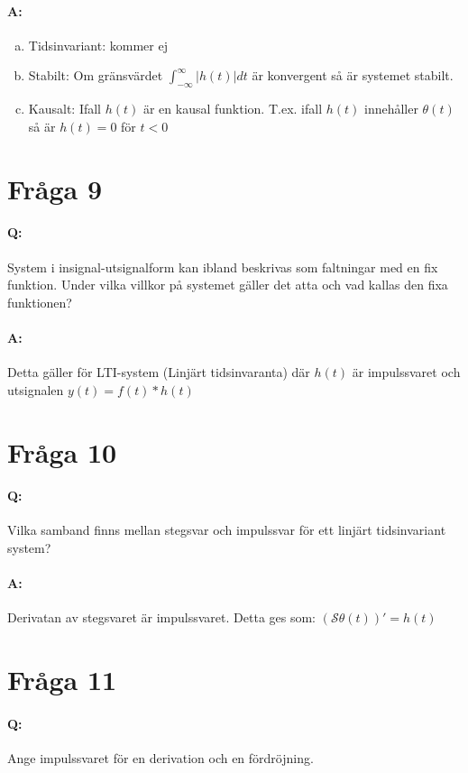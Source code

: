 \documentclass[a4paper]{article}
\begin{document}
\paragraph{A:}
\begin{enumerate}[b)]
\item Tidsinvariant: kommer ej
\item Stabilt: Om gränsvärdet $\int_{-\infty}^{\infty} |h(t)|dt$ är konvergent så är systemet stabilt.
\item Kausalt: Ifall $h(t)$ är en kausal funktion. T.ex. ifall $h(t)$ innehåller $\theta(t)$ så är $h(t)=0$ för $t<0$
\end{enumerate}
\newpage
\section{Fråga 9}
\paragraph{Q:} System i insignal-utsignalform kan ibland beskrivas som faltningar med en fix funktion. Under vilka villkor på systemet gäller det atta och vad kallas den fixa funktionen?
\paragraph{A:} Detta gäller för LTI-system (Linjärt tidsinvaranta) där $h(t)$ är impulssvaret och utsignalen $y(t)=f(t)*h(t)$ 

\section{Fråga 10}
\paragraph{Q:} Vilka samband finns mellan stegsvar och impulssvar för ett linjärt tidsinvariant system?
\paragraph{A:} Derivatan av stegsvaret är impulssvaret. Detta ges som: $(\mathcal{S}\theta(t))' = h(t)$

\section{Fråga 11}
\paragraph{Q:} Ange impulssvaret för en derivation och en fördröjning.
\end{document}
